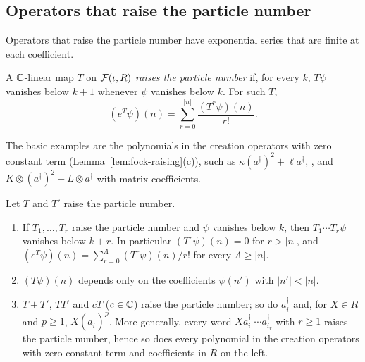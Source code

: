 \subsection{Operators that raise the particle number}

Operators that raise the particle number have exponential series that are finite at each
coefficient.

\begin{definition}\label{def:fock-raising}
A $\mathbb C$-linear map $T$ on $\mathcal F(\iota,R)$ \emph{raises the particle number} if, for
every $k$, $T\psi$
vanishes below $k+1$ whenever $\psi$ vanishes below $k$. For such $T$,
\[
 (e^T\psi)(n)=\sum_{r=0}^{\lvert n\rvert}\frac{(T^r\psi)(n)}{r!}.
\]
\end{definition}

The basic examples are the polynomials in the creation operators with zero constant term
(Lemma~\ref{lem:fock-raising}(c)), such as $\kappa(a^\dagger)^2+\ell a^\dagger$, , and
$K\otimes(a^\dagger)^2+L\otimes a^\dagger$ with matrix coefficients.

\begin{lemma}\label{lem:fock-raising}
Let $T$ and $T'$ raise the particle number.
\begin{enumerate}
\item[(a)] If $T_1,\ldots,T_r$ raise the particle number and $\psi$ vanishes below $k$, then
$T_1\cdots T_r\psi$ vanishes below $k+r$. In particular $(T^r\psi)(n)=0$ for
$r>\lvert n\rvert$, and $(e^T\psi)(n)=\sum_{r=0}^{\Lambda}(T^r\psi)(n)/r!$ for every
$\Lambda\ge\lvert n\rvert$.
\item[(b)] $(T\psi)(n)$ depends only on the coefficients $\psi(n')$ with
$\lvert n'\rvert<\lvert n\rvert$.
\item[(c)] $T+T'$, $TT'$ and $cT$ ($c\in\mathbb C$) raise the particle number; so do $a_i^\dagger$ and, for
$X\in R$ and $p\ge1$, $X(a_i^\dagger)^p$. More generally, every word $Xa_{i_1}^\dagger\cdots a_{i_r}^\dagger$ with
$r\ge1$ raises the particle number, hence so does every polynomial in the creation operators with
zero constant term and coefficients in $R$ on the left.
\end{enumerate}
\end{lemma}

